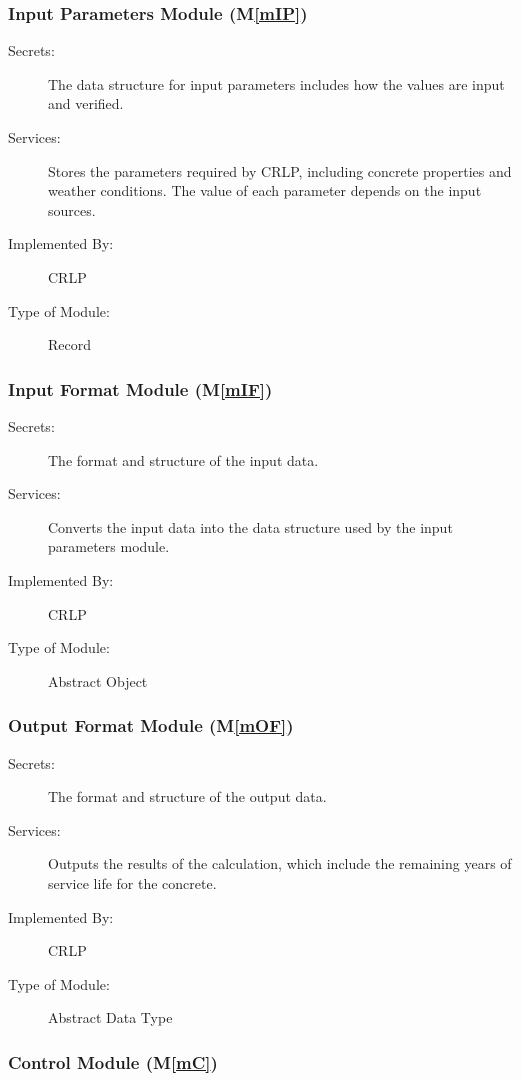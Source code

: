 \documentclass[12pt, titlepage]{article}
\newcommand{\mref}[1]{M\ref{#1}}
\begin{document}
\begin{description}
\subsubsection{Input Parameters Module (\mref{mIP})}

\begin{description}
    \item[Secrets:] The data structure for input parameters includes how the values are input and verified.
    \item[Services:] Stores the parameters required by CRLP, including concrete properties and weather conditions. The value of each parameter depends on the input sources.
    \item[Implemented By:] CRLP
    \item [Type of Module:] Record
\end{description}

\subsubsection{Input Format Module (\mref{mIF})}

\begin{description}
    \item[Secrets:] The format and structure of the input data.
    \item[Services:] Converts the input data into the data structure used by the input parameters module.
    \item[Implemented By:] CRLP
    \item [Type of Module:] Abstract Object
\end{description}

\subsubsection{Output Format Module (\mref{mOF})}

\begin{description}
    \item[Secrets:] The format and structure of the output data.
    \item[Services:] Outputs the results of the calculation, which include the remaining years of service life for the concrete.
    \item[Implemented By:] CRLP
    \item [Type of Module:] Abstract Data Type
\end{description}

\subsubsection{Control Module (\mref{mC})}


\end{description}
\end{document}
